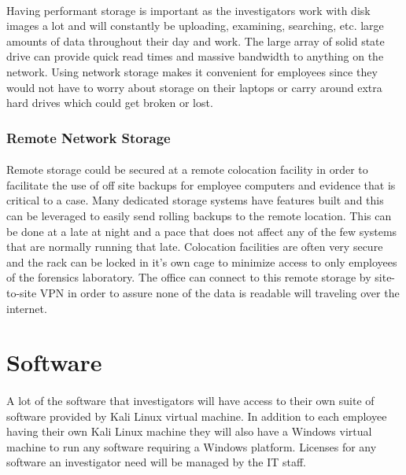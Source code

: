 \documentclass[12pt]{article}
\begin{document}
\paragraph{}
Having performant storage is important as the investigators work with disk images a lot and will constantly be uploading, examining, searching, etc.  large amounts of data throughout their day and work.
The large array of solid state drive can provide quick read times and massive bandwidth to anything on the network.
Using network storage makes it convenient for employees since they would not have to worry about storage on their laptops or carry around extra hard drives which could get broken or lost.


\subsubsection{Remote Network Storage}
\paragraph{}
Remote storage could be secured at a remote colocation facility in order to facilitate the use of off site backups for employee computers and evidence that is critical to a case. 
Many dedicated storage systems have features built and this can be leveraged to easily send rolling backups to the remote location. 
This can be done at a late at night and a pace that does not affect any of the few systems that are normally running that late. 
Colocation facilities are often very secure and the rack can be locked in it's own cage to minimize access to only employees of the forensics laboratory. 
The office can connect to this remote storage by site-to-site VPN in order to assure none of the data is readable will traveling over the internet. 

\section{Software}
\paragraph{}
A lot of the software that investigators will have access to their own suite of software provided by Kali Linux virtual machine. In addition to each employee having their own Kali Linux machine they will also have a Windows virtual machine to run any software requiring a Windows platform. Licenses for any software an investigator need will be managed by the IT staff. 
\end{document}
